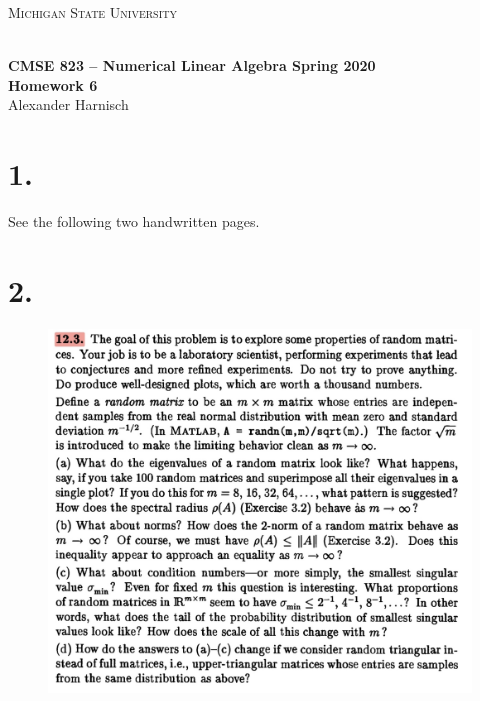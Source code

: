 \documentclass[a4paper, 11pt]{article}
\begin{document}
\noindent
\centerline{\small{\textsc{Michigan State University}}} \\
\large{\textbf{CMSE 823 – Numerical Linear Algebra \hfill Spring 2020 \\
Homework 6}} \\
Alexander Harnisch \\
\noindent\makebox[\linewidth]{\rule{\textwidth}{0.4pt}}

\section*{1.}
See the following two handwritten pages.
\FloatBarrier



\section*{2.}
\begin{figure}
  \centering
  \includegraphics[width=\textwidth]{../2/12_3.jpg}
\end{figure}
\end{document}
